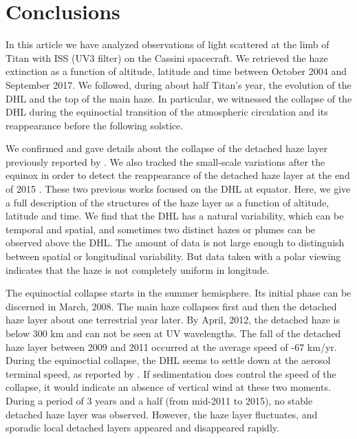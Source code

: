 \section{Conclusions}
\label{seq:conclusions}

In this article we have analyzed observations of light scattered at the limb of Titan with ISS (UV3 filter) on the
Cassini spacecraft. We retrieved the haze extinction as a function of altitude, latitude and time between October 2004 and
September 2017. We followed, during about half Titan's year, the evolution of the DHL and the top of the
main haze. In particular, we witnessed the collapse of the DHL during the equinoctial transition of the atmospheric
circulation and its reappearance before the following solstice.

We confirmed and gave details about the collapse of the detached haze layer previously reported by \cite{West2011}.
We also tracked the small-scale variations after the equinox in order to detect the reappearance of the detached haze
layer at the end of 2015 \citep{West2018}. These two previous works focused on the DHL at equator. Here, we give
a full description of the structures of the haze layer as a function of altitude, latitude and time. We find
that the DHL has a natural variability, which can be temporal and spatial, and sometimes two distinct hazes or plumes
can be observed above the DHL. The amount of data is not large enough to distinguish between spatial or
longitudinal variability. But data taken with a polar viewing indicates that the haze is not completely
uniform in longitude.

The equinoctial collapse starts in the summer hemisphere. Its initial phase can be discerned in March, 2008.
The main haze collapses first and then the detached haze layer about one terrestrial year later. By April, 2012,
the detached haze is below 300 km and can not be seen at UV wavelengths.
The fall of the detached haze layer between 2009 and 2011 occurred at the average speed of -67 km/yr.
During the equinoctial collapse, the DHL seems to settle down at the aerosol terminal speed,
as reported by \cite{West2018}. If sedimentation does control the speed of the collapse,
it would indicate an absence of vertical wind at these two moments.
During a period of 3 years and a half (from mid-2011 to 2015), no stable detached haze layer was observed.
However, the haze layer fluctuates, and sporadic local detached layers appeared and disappeared rapidly.


